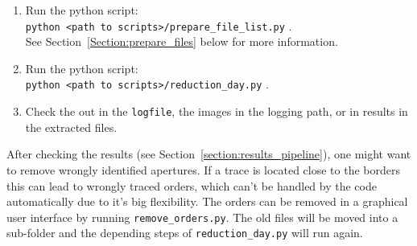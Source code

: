 \documentclass[10pt,a4paper]{article}
\begin{document}
\begin{enumerate}
\begin{description}
  \end{description}
  \item Run the python script: \\ \verb|python <path to scripts>/prepare_file_list.py| . \\ See Section~\ref{Section:prepare_files} below for more information.
  \item Run the python script: \\ \verb|python <path to scripts>/reduction_day.py| .
  \item Check the out in the \verb|logfile|, the images in the logging path, or in results in the extracted files.
\end{enumerate}

\noindent After checking the results (see Section~\ref{section:results_pipeline}), one might want to remove wrongly identified apertures. If a trace is located close to the borders this can lead to wrongly traced orders, which can't be handled by the code automatically due to it's big flexibility. The orders can be removed in a graphical user interface by running \verb|remove_orders.py|. The old files will be moved into a sub-folder and the depending steps of \verb|reduction_day.py| will run again.
\end{document}
